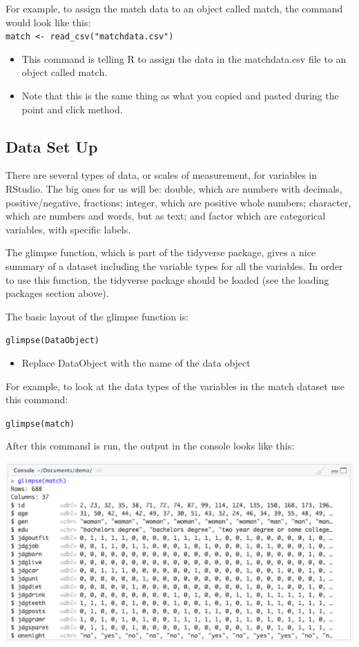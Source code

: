 \documentclass[
]{book}
\providecommand{\tightlist}{%
  \setlength{\itemsep}{0pt}\setlength{\parskip}{0pt}}
\begin{document}
For example, to assign the match data to an object called match, the command would look like this:\\
\texttt{match\ \textless{}-\ read\_csv("matchdata.csv")}

\begin{itemize}
\tightlist
\item
  This command is telling R to assign the data in the matchdata.csv file to an object called match.\\
\item
  Note that this is the same thing as what you copied and pasted during the point and click method.
\end{itemize}

\hypertarget{data-set-up}{%
\subsection{Data Set Up}\label{data-set-up}}

There are several types of data, or scales of measurement, for variables in RStudio. The big ones for us will be: double, which are numbers with decimals, positive/negative, fractions; integer, which are positive whole numbers; character, which are numbers and words, but as text; and factor which are categorical variables, with specific labels.

The glimpse function, which is part of the tidyverse package, gives a nice summary of a dataset including the variable types for all the variables. In order to use this function, the tidyverse package should be loaded (see the loading packages section above).

The basic layout of the glimpse function is:

\texttt{glimpse(DataObject)}

\begin{itemize}
\tightlist
\item
  Replace DataObject with the name of the data object
\end{itemize}

For example, to look at the data types of the variables in the match dataset use this command:

\texttt{glimpse(match)}

After this command is run, the output in the console looks like this:

\includegraphics{img/DATA THINGS R110.png}
\end{document}
